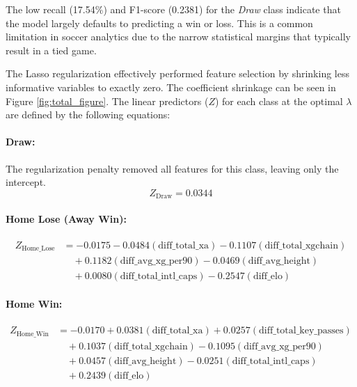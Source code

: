 \documentclass[11pt]{article}
\begin{document}
The low recall (17.54\%) and F1-score (0.2381) for the \textit{Draw} class indicate that the model largely defaults to predicting a win or loss. This is a common limitation in soccer analytics due to the narrow statistical margins that typically result in a tied game.

The Lasso regularization effectively performed feature selection by shrinking less informative variables to exactly zero. The coefficient shrinkage can be seen in Figure \ref{fig:total_figure}. The linear predictors ($Z$) for each class at the optimal $\lambda$ are defined by the following equations:

\paragraph{Draw:}
The regularization penalty removed all features for this class, leaving only the intercept.
\[
Z_{\text{Draw}} = 0.0344
\]

\paragraph{Home Lose (Away Win):}
\begin{align*}
Z_{\text{Home\_Lose}} &= -0.0175 - 0.0484(\text{diff\_total\_xa}) - 0.1107(\text{diff\_total\_xgchain}) \\
&\quad + 0.1182(\text{diff\_avg\_xg\_per90}) - 0.0469(\text{diff\_avg\_height}) \\
&\quad + 0.0080(\text{diff\_total\_intl\_caps}) - 0.2547(\text{diff\_elo})
\end{align*}

\paragraph{Home Win:}
\begin{align*}
Z_{\text{Home\_Win}} &= -0.0170 + 0.0381(\text{diff\_total\_xa}) + 0.0257(\text{diff\_total\_key\_passes}) \\
&\quad + 0.1037(\text{diff\_total\_xgchain}) - 0.1095(\text{diff\_avg\_xg\_per90}) \\
&\quad + 0.0457(\text{diff\_avg\_height}) - 0.0251(\text{diff\_total\_intl\_caps}) \\
&\quad + 0.2439(\text{diff\_elo})
\end{align*}
\end{document}
